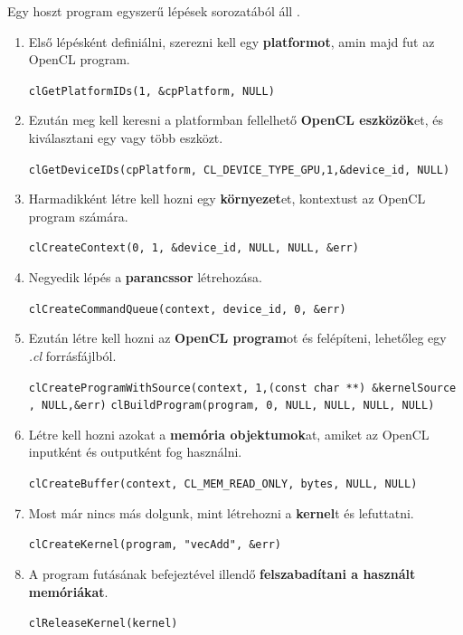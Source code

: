 Egy hoszt program egyszerű lépések sorozatából áll \cite{opencl_host}.

\begin{enumerate}
\item Első lépésként definiálni, szerezni kell egy \textbf{platformot}, amin majd fut az OpenCL program. 

\texttt{clGetPlatformIDs(1, \&cpPlatform, NULL)}
\item Ezután meg kell keresni a platformban fellelhető \textbf{OpenCL eszközök}et, és kiválasztani egy vagy több eszközt.

\texttt{clGetDeviceIDs(cpPlatform, CL\_DEVICE\_TYPE\_GPU,1,\&device\_id, NULL)}
\item Harmadikként létre kell hozni egy \textbf{környezet}et, kontextust az OpenCL program számára.

\texttt{clCreateContext(0, 1, \&device\_id, NULL, NULL, \&err)}
\item Negyedik lépés a \textbf{parancssor} létrehozása.

\texttt{clCreateCommandQueue(context, device\_id, 0, \&err)}
\item Ezután létre kell hozni az \textbf{OpenCL program}ot és felépíteni, lehetőleg egy \textit{.cl} forrásfájlból.

\texttt{clCreateProgramWithSource(context, 1,(const char **) \&kernelSource\\ , NULL,\&err)}
\newline
\texttt{clBuildProgram(program, 0, NULL, NULL, NULL, NULL)}
\item Létre kell hozni azokat a \textbf{memória objektumok}at, amiket az OpenCL inputként és outputként fog használni.

\texttt{clCreateBuffer(context, CL\_MEM\_READ\_ONLY, bytes, NULL, NULL)}
\item Most már nincs más dolgunk, mint létrehozni a \textbf{kernel}t és lefuttatni.

\texttt{clCreateKernel(program, "vecAdd", \&err)}
\item A program futásának befejeztével illendő \textbf{felszabadítani a használt memóriákat}.

\texttt{clReleaseKernel(kernel)}
\end{enumerate}
	
